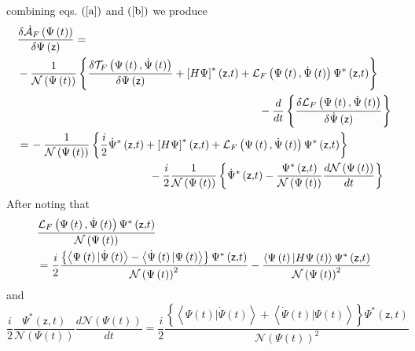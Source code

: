 \documentclass[aps,preprint]{revtex4}
\begin{document}
combining eqs. $\left( \ref{a}\right) $ and $\left( \ref{b}\right) $ we
produce 
\begin{align}
& \frac{\delta\mathcal{\dot{A}}_{F}\left( \Psi\left( t\right) \right) }{%
\delta\Psi\left( \mathsf{z}\right) }=  \notag \\
& -\frac{1}{\mathcal{N}\left( \Psi\left( t\right) \right) }\left\{ \frac{%
\delta\mathcal{T}_{F}\left( \Psi\left( t\right) ,\dot{\Psi}\left( t\right)
\right) }{\delta\Psi\left( \mathsf{z}\right) }+\left[ H\Psi\right]
^{\ast}\left( \mathsf{z,}t\right) +\mathcal{L}_{F}\left( \Psi\left( t\right)
,\dot{\Psi}\left( t\right) \right) \Psi^{\ast}\left( \mathsf{z,}t\right)
\right\}  \notag \\
& \qquad\qquad\qquad\qquad\qquad\qquad\qquad\qquad\qquad\qquad\qquad-\frac {d%
}{dt}\left\{ \frac{\delta\mathcal{L}_{F}\left( \Psi\left( t\right) ,\dot{\Psi%
}\left( t\right) \right) }{\delta\dot{\Psi}\left( \mathsf{z}\right) }\right\}
\notag \\
& \left. =\right. -\frac{1}{\mathcal{N}\left( \Psi\left( t\right) \right) }%
\left\{ \frac{i}{2}\dot{\Psi}^{\ast}\left( \mathsf{z,}t\right) +\left[ H\Psi%
\right] ^{\ast}\left( \mathsf{z,}t\right) +\mathcal{L}_{F}\left( \Psi\left(
t\right) ,\dot{\Psi}\left( t\right) \right) \Psi^{\ast}\left( \mathsf{z,}%
t\right) \right\}  \notag \\
& \qquad\qquad\qquad\qquad\qquad\qquad-\frac{i}{2}\frac{1}{\mathcal{N}\left(
\Psi\left( t\right) \right) }\left\{ \dot{\Psi}^{\ast}\left( \mathsf{z,}%
t\right) -\frac{\Psi^{\ast}\left( \mathsf{z,}t\right) }{\mathcal{N}\left(
\Psi\left( t\right) \right) }\frac{d\mathcal{N}\left( \Psi\left( t\right)
\right) }{dt}\right\}
\end{align}
After noting that 
\begin{align}
& \frac{\mathcal{L}_{F}\left( \Psi\left( t\right) ,\dot{\Psi}\left( t\right)
\right) \Psi^{\ast}\left( \mathsf{z,}t\right) }{\mathcal{N}\left( \Psi\left(
t\right) \right) }  \notag \\
& \left. =\right. \frac{i}{2}\frac{\left\{ \left\langle \Psi\left( t\right) |%
\dot{\Psi}\left( t\right) \right\rangle -\left\langle \dot{\Psi }\left(
t\right) |\Psi\left( t\right) \right\rangle \right\} \Psi^{\ast }\left( 
\mathsf{z,}t\right) }{\mathcal{N}\left( \Psi\left( t\right) \right) ^{2}}-%
\frac{\left\langle \Psi\left( t\right) |H\Psi\left( t\right) \right\rangle
\Psi^{\ast}\left( \mathsf{z,}t\right) }{\mathcal{N}\left( \Psi\left(
t\right) \right) ^{2}}
\end{align}
and 
\begin{equation}
\frac{i}{2}\frac{\Psi^{\ast}\left( \mathsf{z,}t\right) }{\mathcal{N}\left(
\Psi\left( t\right) \right) }\frac{d\mathcal{N}\left( \Psi\left( t\right)
\right) }{dt}=\frac{i}{2}\frac{\left\{ \left\langle \Psi\left( t\right) |%
\dot{\Psi}\left( t\right) \right\rangle +\left\langle \dot{\Psi }\left(
t\right) |\Psi\left( t\right) \right\rangle \right\} \Psi^{\ast }\left( 
\mathsf{z,}t\right) }{\mathcal{N}\left( \Psi\left( t\right) \right) ^{2}}
\end{equation}
\end{document}
